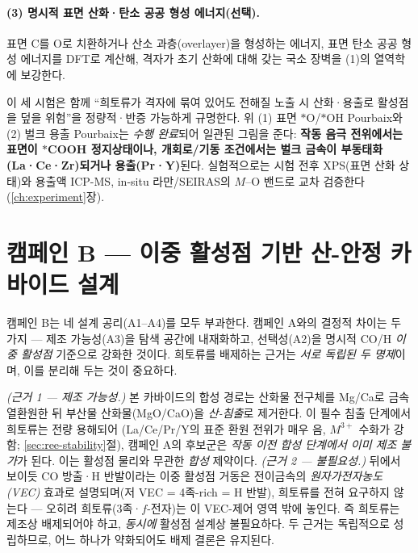 \documentclass[11pt,a4paper]{report}
\begin{document}
\paragraph{(3) 명시적 표면 산화·탄소 공공 형성 에너지(선택).} 표면 C를 O로 치환하거나 산소
과층(overlayer)을 형성하는 에너지, 표면 탄소 공공 형성 에너지를 DFT로 계산해, 격자가 초기 산화에
대해 갖는 국소 장벽을 (1)의 열역학에 보강한다.

이 세 시험은 함께 ``희토류가 격자에 묶여 있어도 전해질 노출 시 산화·용출로 활성점을 덮을 위험''을
정량적·반증 가능하게 규명한다. 위 (1) 표면 $*$O/$*$OH Pourbaix와 (2) 벌크 용출 Pourbaix는 \emph{수행
완료}되어 일관된 그림을 준다: \textbf{작동 음극 전위에서는 표면이 $*$COOH 정지상태이나, 개회로/기동
조건에서는 벌크 금속이 부동태화(La·Ce·Zr)되거나 용출(Pr·Y)}된다. 실험적으로는 시험 전후 XPS(표면
산화 상태)와 용출액 ICP-MS, in-situ 라만/SEIRAS의 $M$--O 밴드로 교차 검증한다(\ref{ch:experiment}장).

\section{캠페인 B --- 이중 활성점 기반 산-안정 카바이드 설계}
\label{sec:campaignB}\label{sec:ree-free}
캠페인 B는 네 설계 공리(A1--A4)를 모두 부과한다. 캠페인 A와의 결정적 차이는 두 가지 --- 제조
가능성(A3)을 탐색 공간에 내재화하고, 선택성(A2)을 명시적 CO/H \emph{이중 활성점} 기준으로 강화한
것이다. 희토류를 배제하는 근거는 \emph{서로 독립된 두 명제}이며, 이를 분리해 두는 것이 중요하다.

\emph{(근거 1 --- 제조 가능성.)} 본 카바이드의 합성 경로는 산화물 전구체를 Mg/Ca로 금속열환원한 뒤
부산물 산화물(MgO/CaO)을 \emph{산-침출}로 제거한다. 이 필수 침출 단계에서 희토류는 전량 용해되어
(La/Ce/Pr/Y의 표준 환원 전위가 매우 음, $M^{3+}$ 수화가 강함; \ref{sec:ree-stability}절), 캠페인 A의
후보군은 \emph{작동 이전 합성 단계에서 이미 제조 불가}가 된다. 이는 활성점 물리와 무관한 \emph{합성}
제약이다. \emph{(근거 2 --- 불필요성.)} 뒤에서 보이듯 CO 방출·H 반발이라는 이중 활성점 거동은
전이금속의 \emph{원자가전자농도(VEC)} 효과로 설명되며(저 VEC = 4족-rich = H 반발), 희토류를 전혀
요구하지 않는다 --- 오히려 희토류(3족·$f$-전자)는 이 VEC-제어 영역 밖에 놓인다. 즉 희토류는 제조상
배제되어야 하고, \emph{동시에} 활성점 설계상 불필요하다. 두 근거는 독립적으로 성립하므로, 어느 하나가
약화되어도 배제 결론은 유지된다.
\end{document}
